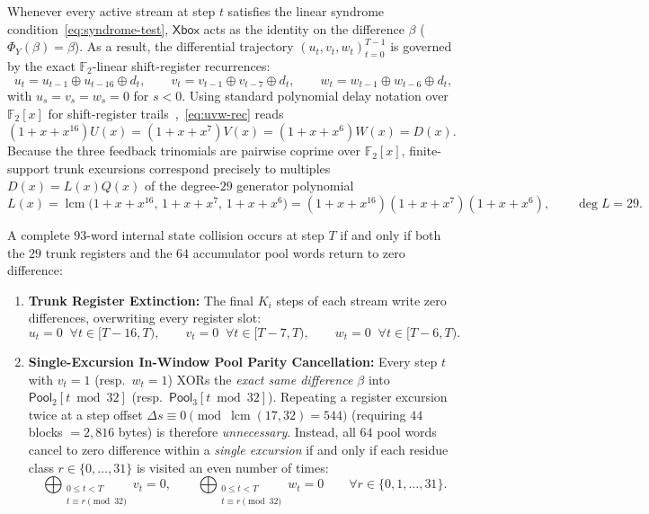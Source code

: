 \documentclass[11pt,a4paper]{article}
\theoremstyle{definition}
\theoremstyle{remark}
\newcommand{\Ftwo}{\mathbb{F}_2}
\newcommand{\Xbox}{\mathsf{Xbox}}
\newcommand{\Pool}{\mathsf{Pool}}
\newcommand{\lcm}{\operatorname{lcm}}
\begin{document}
Whenever every active stream at step $t$ satisfies the linear syndrome condition~\eqref{eq:syndrome-test}, $\Xbox$ acts as the identity on the difference $\beta$ ($\Phi_Y(\beta) = \beta$). As a result, the differential trajectory $(u_t, v_t, w_t)_{t=0}^{T-1}$ is governed by the exact $\Ftwo$-linear shift-register recurrences:
\begin{equation}
\label{eq:uvw-rec}
u_t = u_{t-1} \oplus u_{t-16} \oplus d_t, \qquad
v_t = v_{t-1} \oplus v_{t-7}  \oplus d_t, \qquad
w_t = w_{t-1} \oplus w_{t-6}  \oplus d_t,
\end{equation}
with $u_s = v_s = w_s = 0$ for $s < 0$. Using standard polynomial delay notation over $\Ftwo[x]$ for shift-register trails~\cite{RVP01,DaemenVanAssche},~\eqref{eq:uvw-rec} reads $(1 + x + x^{16})U(x) = (1 + x + x^7)V(x) = (1 + x + x^6)W(x) = D(x)$. Because the three feedback trinomials are pairwise coprime over $\Ftwo[x]$, finite-support trunk excursions correspond precisely to multiples $D(x) = L(x) Q(x)$ of the degree-$29$ generator polynomial
\begin{equation}
\label{eq:lcm-poly}
L(x) = \lcm\big(1 + x + x^{16}, \, 1 + x + x^7, \, 1 + x + x^6\big) = (1 + x + x^{16})(1 + x + x^7)(1 + x + x^6), \qquad \deg L = 29.
\end{equation}

A complete $93$-word internal state collision occurs at step $T$ if and only if both the $29$ trunk registers and the $64$ accumulator pool words return to zero difference:
\begin{enumerate}[leftmargin=2em]
    \item \textbf{Trunk Register Extinction:} The final $K_i$ steps of each stream write zero differences, overwriting every register slot:
    \begin{equation}
    \label{eq:tail-zero}
    u_t = 0 \;\;\forall t \in [T-16, T), \qquad
    v_t = 0 \;\;\forall t \in [T-7, T), \qquad
    w_t = 0 \;\;\forall t \in [T-6, T).
    \end{equation}
    \item \textbf{Single-Excursion In-Window Pool Parity Cancellation:} Every step $t$ with $v_t = 1$ (resp.\ $w_t = 1$) XORs the \emph{exact same difference $\beta$} into $\Pool_2[t \bmod 32]$ (resp.\ $\Pool_3[t \bmod 32]$). Repeating a register excursion twice at a step offset $\Delta s \equiv 0 \pmod{\lcm(17, 32) = 544}$ (requiring $44$ blocks $= 2{,}816$ bytes) is therefore \emph{unnecessary}. Instead, all $64$ pool words cancel to zero difference within a \emph{single excursion} if and only if each residue class $r \in \{0, \dots, 31\}$ is visited an even number of times:
    \begin{equation}
    \label{eq:pool-parity}
    \bigoplus_{\substack{0 \le t < T \\ t \equiv r \pmod{32}}} v_t = 0, \qquad
    \bigoplus_{\substack{0 \le t < T \\ t \equiv r \pmod{32}}} w_t = 0 \qquad \forall r \in \{0, 1, \dots, 31\}.
    \end{equation}
\end{enumerate}
\end{document}
